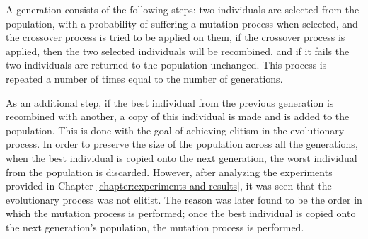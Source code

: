 A generation consists of the following steps: two individuals are selected from
the population, with a probability of suffering a mutation process when
selected, and the crossover process is tried to be applied on them, if the
crossover process is applied, then the two selected individuals will be
recombined, and if it fails the two individuals are returned to the population
unchanged. This process is repeated a number of times equal to the number of
generations.

As an additional step, if the best individual from the previous generation is
recombined with another, a copy of this individual is made and is added to the
population. This is done with the goal of achieving elitism in the evolutionary
process. In order to preserve the size of the population across all the
generations, when the best individual is copied onto the next generation, the
worst individual from the population is discarded. However, after analyzing the
experiments provided in Chapter \ref{chapter:experiments-and-results}, it was
seen that the evolutionary process was not elitist. The reason was later found
to be the order in which the mutation process is performed; once the best
individual is copied onto the next generation's population, the mutation process
is performed.